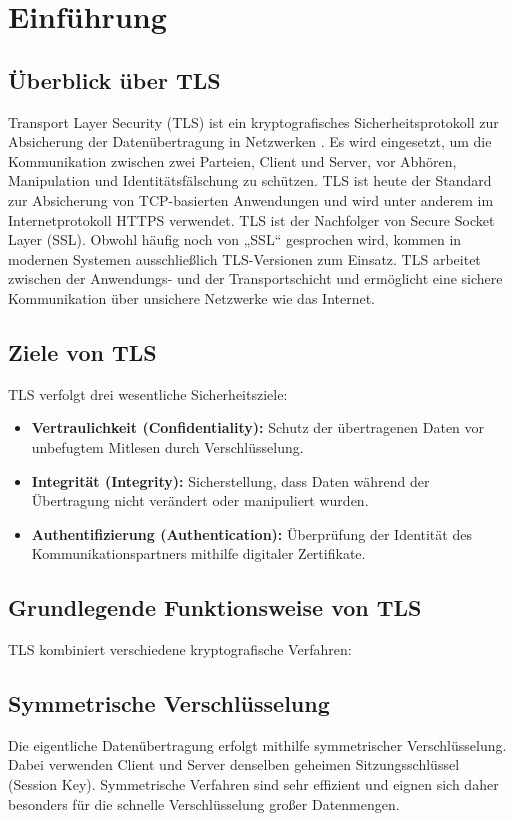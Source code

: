 \section{Einführung}
\subsection{Überblick über TLS}
Transport Layer Security (TLS) ist ein kryptografisches Sicherheitsprotokoll zur Absicherung der Datenübertragung in Netzwerken \cite{rfc8446}. Es wird eingesetzt, um die Kommunikation zwischen zwei Parteien, Client und Server, vor Abhören, Manipulation und Identitätsfälschung zu schützen. TLS ist heute der Standard zur Absicherung von TCP-basierten Anwendungen und wird unter anderem im Internetprotokoll HTTPS verwendet. TLS ist der Nachfolger von Secure Socket Layer (SSL). Obwohl häufig noch von „SSL“ gesprochen wird, kommen in modernen Systemen ausschließlich TLS-Versionen zum Einsatz. TLS arbeitet zwischen der Anwendungs- und der Transportschicht und ermöglicht eine sichere Kommunikation über unsichere Netzwerke wie das Internet.
\subsection{Ziele von TLS}
TLS verfolgt drei wesentliche Sicherheitsziele:
\begin{itemize}
  \item \textbf{Vertraulichkeit (Confidentiality):} Schutz der übertragenen Daten vor unbefugtem Mitlesen durch Verschlüsselung.
  \item \textbf{Integrität (Integrity):} Sicherstellung, dass Daten während der Übertragung nicht verändert oder manipuliert wurden.
  \item \textbf{Authentifizierung (Authentication):} Überprüfung der Identität des Kommunikationspartners mithilfe digitaler Zertifikate.
\end{itemize}

\subsection{Grundlegende Funktionsweise von TLS}
TLS kombiniert verschiedene kryptografische Verfahren:

\subsection*{Symmetrische Verschlüsselung}
Die eigentliche Datenübertragung erfolgt mithilfe symmetrischer Verschlüsselung. Dabei verwenden Client und Server denselben geheimen Sitzungsschlüssel (Session Key). Symmetrische Verfahren sind sehr effizient und eignen sich daher besonders für die schnelle Verschlüsselung großer Datenmengen.

